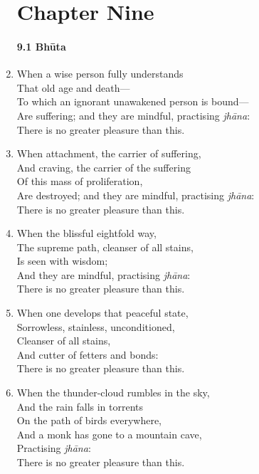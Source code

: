 \documentclass[10pt, openany]{book}
\begin{document}
\begin{enumerate}
\chapter*{Chapter Nine}

\subsubsection*{9.1 Bhūta}

\item When a wise person fully understands \\
That old age and death—\\
To which an ignorant unawakened person is bound—\\
Are suffering; and they are mindful, practising \emph{jhāna}:\\
There is no greater pleasure than this.

\item When attachment, the carrier of suffering,\\
And craving, the carrier of the suffering \\
Of this mass of proliferation,\\
Are destroyed; and they are mindful, practising \emph{jhāna}:\\
There is no greater pleasure than this.

\item When the blissful eightfold way,\\
The supreme path, cleanser of all stains,\\
Is seen with wisdom; \\
And they are mindful, practising \emph{jhāna}:\\
There is no greater pleasure than this.

\item When one develops that peaceful state,\\
Sorrowless, stainless, unconditioned,\\
Cleanser of all stains, \\
And cutter of fetters and bonds:\\
There is no greater pleasure than this.

\item When the thunder-cloud rumbles in the sky,\\
And the rain falls in torrents \\
On the path of birds everywhere,\\
And a monk has gone to a mountain cave, \\
Practising \emph{jhāna}:\\
There is no greater pleasure than this.


\end{enumerate}
\end{document}
